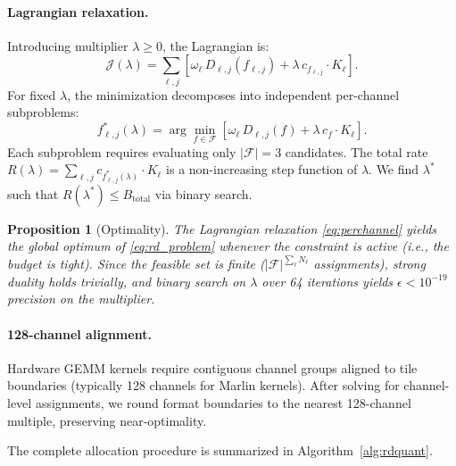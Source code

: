 \documentclass{article}
\newtheorem{proposition}{Proposition}
\begin{document}
\paragraph{Lagrangian relaxation.}
Introducing multiplier $\lambda \geq 0$, the Lagrangian is:
\begin{equation}
\mathcal{J}(\lambda) = \sum_{\ell,j} \left[\omega_\ell \, D_{\ell,j}(f_{\ell,j}) + \lambda \, c_{f_{\ell,j}} \cdot K_\ell \right].
\end{equation}
For fixed $\lambda$, the minimization decomposes into independent per-channel subproblems:
\begin{equation}
\label{eq:perchannel}
f_{\ell,j}^*(\lambda) = \arg\min_{f \in \mathcal{F}} \left[\omega_\ell \, D_{\ell,j}(f) + \lambda \, c_f \cdot K_\ell \right].
\end{equation}
Each subproblem requires evaluating only $|\mathcal{F}| = 3$ candidates.
The total rate $R(\lambda) = \sum_{\ell,j} c_{f_{\ell,j}^*(\lambda)} \cdot K_\ell$ is a non-increasing step function of $\lambda$.
We find $\lambda^*$ such that $R(\lambda^*) \leq B_\text{total}$ via binary search.

\begin{proposition}[Optimality]
\label{prop:optimal}
The Lagrangian relaxation \eqref{eq:perchannel} yields the global optimum of \eqref{eq:rd_problem} whenever the constraint is active (i.e., the budget is tight).
Since the feasible set is finite ($|\mathcal{F}|^{\sum_\ell N_\ell}$ assignments), strong duality holds trivially, and binary search on $\lambda$ over 64 iterations yields $\epsilon < 10^{-19}$ precision on the multiplier.
\end{proposition}

\paragraph{128-channel alignment.}
Hardware GEMM kernels require contiguous channel groups aligned to tile boundaries (typically 128 channels for Marlin kernels).
After solving for channel-level assignments, we round format boundaries to the nearest 128-channel multiple, preserving near-optimality.

The complete allocation procedure is summarized in Algorithm~\ref{alg:rdquant}.
\end{document}
